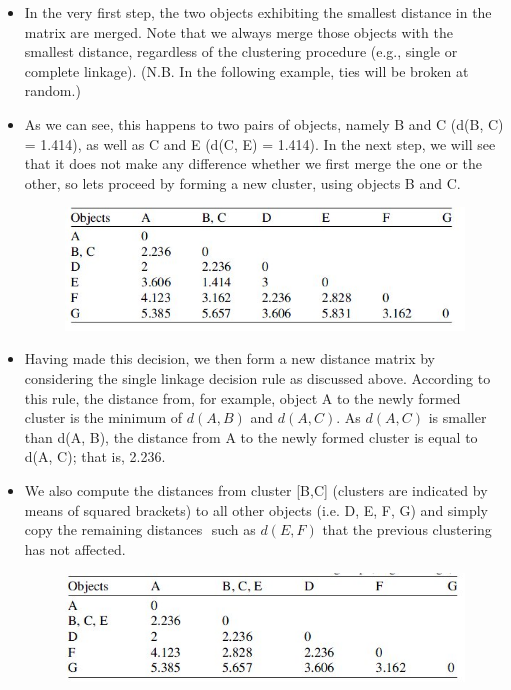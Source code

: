 \documentclass[a4paper,12pt]{article}
\begin{document}
\begin{itemize}
	\item In the very first step, the two
	objects exhibiting the smallest distance in the matrix are merged. Note that we
	always merge those objects with the smallest distance, regardless of the clustering
	procedure (e.g., single or complete linkage). (N.B. In the following example, ties will be broken at random.)
	\item As we can see, this happens to two
	pairs of objects, namely B and C (d(B, C) = 1.414), as well as C and E (d(C, E) =
	1.414). In the next step, we will see that it does not make any difference whether we
	first merge the one or the other, so lets proceed by forming a new cluster, using
	objects B and C.
	\begin{figure}[h!]
		\begin{center}
			\includegraphics[scale=0.6]{images/DistanceMatrix2.jpg}\\
		\end{center}
	\end{figure}
	\item Having made this decision, we then form a new distance matrix by considering
	the single linkage decision rule as discussed above. According to this rule, the
	distance from, for example, object A to the newly formed cluster is the minimum of
	$d(A, B)$ and $d(A, C)$. As $d(A, C)$ is smaller than d(A, B), the distance from A to the
	newly formed cluster is equal to d(A, C); that is, 2.236.
	\item We also compute the
	distances from cluster [B,C] (clusters are indicated by means of squared brackets)
	to all other objects (i.e. D, E, F, G) and simply copy the remaining distances  such
	as $d(E, F)$  that the previous clustering has not affected.
	\begin{figure}[h!]
		\begin{center}
			\includegraphics[scale=0.6]{images/DistanceMatrix3.jpg}\\

\end{center}
\end{figure}
\end{itemize}
\end{document}
